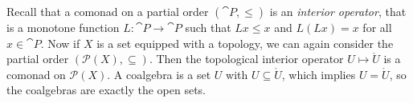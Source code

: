 \begin{example}[Topology]
    Recall that a comonad on a partial order $(\cat{P},\leq)$ is an \textit{interior operator},
    that is a monotone function $L \colon \cat{P} \to \cat{P}$ such that $Lx \leq x$
    and $L(Lx) = x$ for all $x \in \cat{P}$. 
    Now if $X$ is a set equipped with a topology, we can again consider the partial order
    $(\mathcal{P}(X),\subseteq)$.
    Then the topological interior operator $U \mapsto \mathring{U}$ is a comonad on $\mathcal{P}(X)$. 
    A coalgebra is a set $U$ with $U \subseteq \mathring{U}$, which implies $U = \mathring{U}$,
    so the coalgebras are exactly the open sets.
\end{example}
